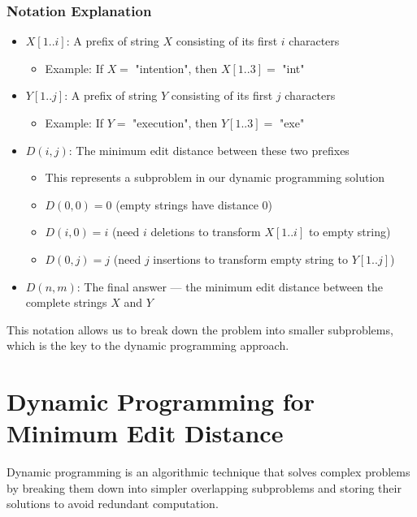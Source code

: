 \documentclass[11pt,a4paper]{article}
\theoremstyle{definition}
\theoremstyle{plain}
\theoremstyle{remark}
\begin{document}
\subsubsection{Notation Explanation}

\begin{itemize}
    \item \textbf{$X[1..i]$}: A prefix of string $X$ consisting of its first $i$ characters
    \begin{itemize}
        \item Example: If $X = $ "intention", then $X[1..3] = $ "int"
    \end{itemize}
    
    \item \textbf{$Y[1..j]$}: A prefix of string $Y$ consisting of its first $j$ characters
    \begin{itemize}
        \item Example: If $Y = $ "execution", then $Y[1..3] = $ "exe"
    \end{itemize}
    
    \item \textbf{$D(i,j)$}: The minimum edit distance between these two prefixes
    \begin{itemize}
        \item This represents a subproblem in our dynamic programming solution
        \item $D(0,0) = 0$ (empty strings have distance 0)
        \item $D(i,0) = i$ (need $i$ deletions to transform $X[1..i]$ to empty string)
        \item $D(0,j) = j$ (need $j$ insertions to transform empty string to $Y[1..j]$)
    \end{itemize}
    
    \item \textbf{$D(n,m)$}: The final answer — the minimum edit distance between the complete strings $X$ and $Y$
\end{itemize}

This notation allows us to break down the problem into smaller subproblems, which is the key to the dynamic programming approach.

\newpage
\section{Dynamic Programming for Minimum Edit Distance}

Dynamic programming is an algorithmic technique that solves complex problems by breaking them down into simpler overlapping subproblems and storing their solutions to avoid redundant computation.
\end{document}
